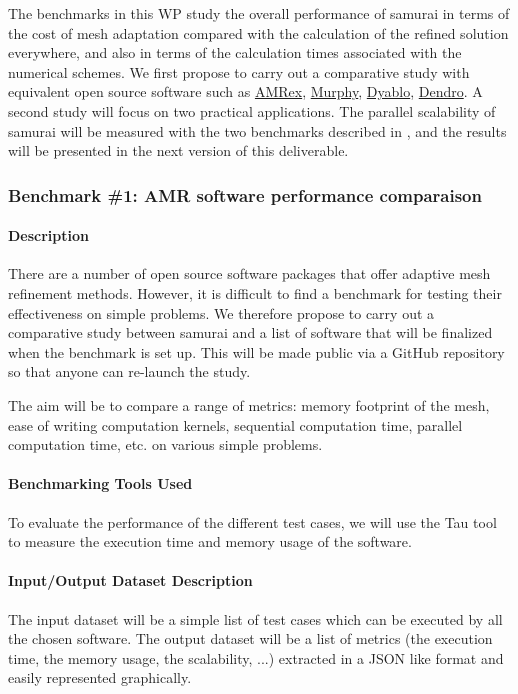 The benchmarks in this WP study the overall performance of samurai in terms of the cost of mesh adaptation compared with the calculation of the refined solution everywhere, and also in terms of the calculation times associated with the numerical schemes. We first propose to carry out a comparative study with equivalent open source software such as \href{https://github.com/AMReX-Codes/amrex}{AMRex}, \href{https://github.com/vanreeslab/murphy}{Murphy}, \href{https://github.com/Dyablo-HPC/Dyablo}{Dyablo}, \href{https://github.com/paralab/Dendro-5.01}{Dendro}. A second study will focus on two practical applications.
The parallel scalability of samurai will be measured with the two benchmarks described in , and the results will be presented in the next version of this deliverable.

\subsubsection{Benchmark \#1: AMR software performance comparaison}

\paragraph{Description}

There are a number of open source software packages that offer adaptive mesh refinement methods. However, it is difficult to find a benchmark for testing their effectiveness on simple problems. We therefore propose to carry out a comparative study between samurai and a list of software that will be finalized when the benchmark is set up. This will be made public via a GitHub repository so that anyone can re-launch the study.

The aim will be to compare a range of metrics: memory footprint of the mesh, ease of writing computation kernels, sequential computation time, parallel computation time, etc. on various simple problems.

\paragraph{Benchmarking Tools Used}
To evaluate the performance of the different test cases, we will use the Tau tool to measure the execution time and memory usage of the software.

\paragraph{Input/Output Dataset Description}
The input dataset will be a simple list of test cases which can be executed by all the chosen software. The output dataset will be a list of metrics (the execution time, the memory usage, the scalability, ...) extracted in a JSON like format and easily represented graphically.

